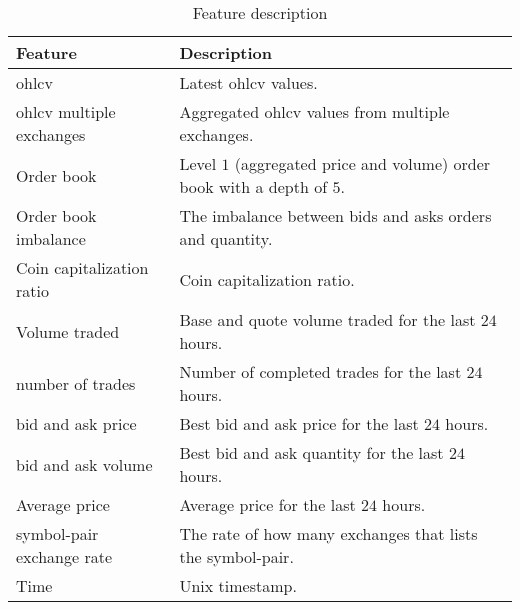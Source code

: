 \begin{table}[ht]
    \centering
    \begin{tabular}{p{} p{}}
        \hline
        \textbf{Feature} & \textbf{Description}\\
        \hline
        \ac{ohlcv}                      & Latest \ac{ohlcv} values.\\
        \hline
        \ac{ohlcv} multiple exchanges   & Aggregated \ac{ohlcv} values from multiple exchanges.\\
        \hline
        Order book                      & Level $1$ (aggregated price and volume) order book with a depth of $5$.\\
        \hline
        Order book imbalance            & The imbalance between bids and asks orders and quantity.\\
        \hline
        Coin capitalization ratio       & Coin capitalization ratio.\\
        \hline
        Volume traded                   & Base and quote volume traded for the last $24$ hours.\\
        \hline
        number of trades                & Number of completed trades for the last $24$ hours.\\      
        \hline
        bid and ask price               & Best bid and ask price for the last $24$ hours.\\
        \hline
        bid and ask volume              & Best bid and ask quantity for the last $24$ hours.\\
        \hline
        Average price                   & Average price for the last $24$ hours.\\
        \hline
        symbol-pair exchange rate       & The rate of how many exchanges that lists the symbol-pair.\\ 
        \hline
        Time                            & Unix timestamp.\\
        \hline
    \end{tabular}
    \caption[Features description]{Feature description}
    \label{tab:features}
\end{table}
